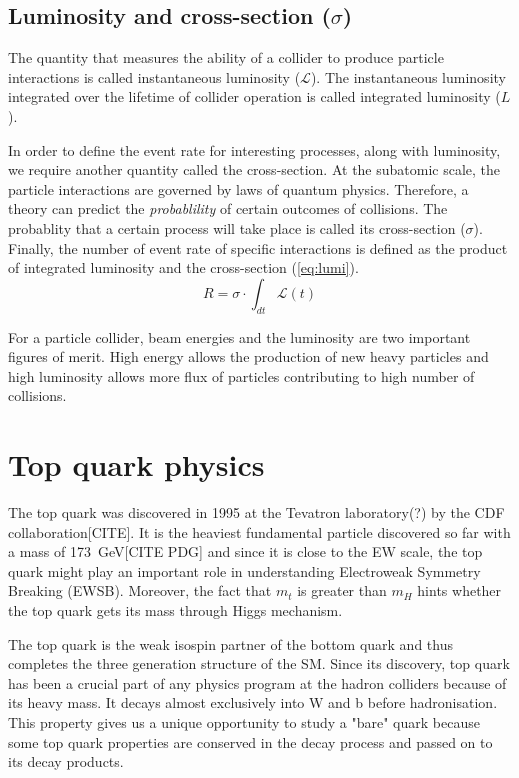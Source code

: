\subsection*{Luminosity and cross-section ($\sigma$)}
The quantity that measures the ability of a collider to produce particle interactions is called
instantaneous luminosity ($\mathcal{L}$). The instantaneous luminosity integrated over the lifetime
of collider operation is called integrated luminosity ($L$).

In order to define the event rate for interesting processes, along with luminosity, we require
another quantity called the cross-section. At the subatomic scale, the particle interactions 
are governed by laws of quantum physics. Therefore, a theory can predict 
the \textit{probablility} of certain outcomes of collisions. The probablity that a certain
process will take place is called its cross-section ($\sigma$). Finally, the number of event rate of
specific interactions is defined as the product of integrated luminosity and the cross-section (\cref{eq:lumi}).
\begin{equation}
    R = \sigma \cdot \int_{dt} \mathcal{L}(t)
    \label{eq:lumi}
\end{equation}

For a particle collider, beam energies and the luminosity are two important figures of merit. 
High energy allows the production of new heavy particles and high luminosity allows more flux 
of particles contributing to high number of collisions.





\section{Top quark physics}
The top quark was discovered in 1995 at the Tevatron laboratory(?) by the CDF collaboration[CITE].
It is the heaviest fundamental particle discovered so far with a mass of \SI{173}{\GeV}[CITE PDG] 
and since it is close to the EW scale, the top quark might play an important role in understanding
Electroweak Symmetry Breaking (EWSB). Moreover, the fact that $m_t$ is greater than $m_H$ hints whether
the top quark gets its mass through Higgs mechanism.  

The top quark is the weak isospin partner of the bottom quark and thus completes the three 
generation structure of the SM. Since its discovery, top quark has been a crucial part of
any physics program at the hadron colliders because of its heavy mass. It decays almost exclusively
into W and b before hadronisation. This property gives us a unique opportunity to study a "bare"
quark because some top quark properties are conserved in the decay process and passed on to 
its decay products.

